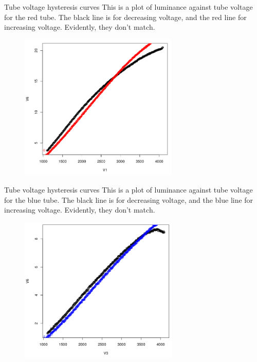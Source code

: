 \documentclass{beamer}
\begin{document}
\begin{frame}[t]{Tube voltage hysteresis curves}
This is a plot of luminance against tube voltage for the red tube. The black line is for decreasing voltage, and the red line for increasing voltage. Evidently, they don't match.
\begin{figure}[c]
\includegraphics[height=7cm]{redhysteresis.png}
\end{figure}
\end{frame}

\begin{frame}[t]{Tube voltage hysteresis curves}
This is a plot of luminance against tube voltage for the blue tube. The black line is for decreasing voltage, and the blue line for increasing voltage. Evidently, they don't match.
\begin{figure}[c]
\includegraphics[height=7cm]{bluehysteresis.png}
\end{figure}
\end{frame}
\end{document}
